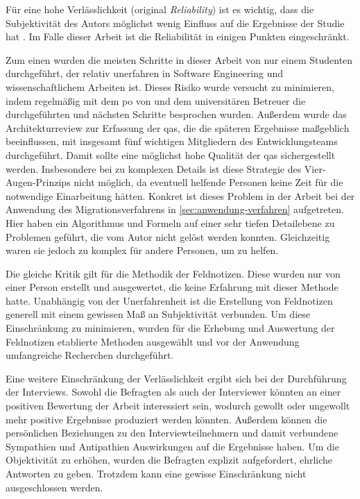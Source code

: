Für eine hohe Verlässlichkeit (original \emph{Reliability}) ist es wichtig, dass die Subjektivität des Autors möglichst wenig Einfluss auf die Ergebnisse der Studie hat \cite{Runeson2009}.
Im Falle dieser Arbeit ist die Reliabilität in einigen Punkten eingeschränkt.

Zum einen wurden die meisten Schritte in dieser Arbeit von nur einem Studenten durchgeführt, der relativ unerfahren in Software Engineering und wissenschaftlichem Arbeiten ist.
Dieses Risiko wurde versucht zu minimieren, indem regelmäßig mit dem \gls{po} von \jf und dem universitären Betreuer die durchgeführten und nächsten Schritte besprochen wurden.
Außerdem wurde das Architekturreview zur Erfassung der \glspl{qa}, die die späteren Ergebnisse maßgeblich beeinflussen, mit insgesamt fünf wichtigen Mitgliedern des Entwicklungsteams durchgeführt.
Damit sollte eine möglichst hohe Qualität der \glspl{qa} sichergestellt werden.
Insbesondere bei zu komplexen Details ist diese Strategie des Vier-Augen-Prinzips nicht möglich, da eventuell helfende Personen keine Zeit für die notwendige Einarbeitung hätten. 
Konkret ist dieses Problem in der Arbeit bei der Anwendung des Migrationsverfahrens in \cref{sec:anwendung-verfahren} aufgetreten.
Hier haben ein Algorithmus und Formeln auf einer sehr tiefen Detailebene zu Problemen geführt, die vom Autor nicht gelöst werden konnten.
Gleichzeitig waren sie jedoch zu komplex für andere Personen, um zu helfen.

Die gleiche Kritik gilt für die Methodik der Feldnotizen.
Diese wurden nur von einer Person erstellt und ausgewertet, die keine Erfahrung mit dieser Methode hatte.
Unabhängig von der Unerfahrenheit ist die Erstellung von Feldnotizen generell mit einem gewissen Maß an Subjektivität verbunden.
Um diese Einschränkung zu minimieren, wurden für die Erhebung und Auswertung der Feldnotizen etablierte Methoden ausgewählt und vor der Anwendung umfangreiche Recherchen durchgeführt.

Eine weitere Einschränkung der Verlässlichkeit ergibt sich bei der Durchführung der Interviews. 
Sowohl die Befragten als auch der Interviewer könnten an einer positiven Bewertung der Arbeit interessiert sein, wodurch gewollt oder ungewollt mehr positive Ergebnisse produziert werden könnten.
Außerdem können die persönlichen Beziehungen zu den Interviewteilnehmern und damit verbundene Sympathien und Antipathien Auswirkungen auf die Ergebnisse haben.
Um die Objektivität zu erhöhen, wurden die Befragten explizit aufgefordert, ehrliche Antworten zu geben. 
Trotzdem kann eine gewisse Einschränkung nicht ausgeschlossen werden.

